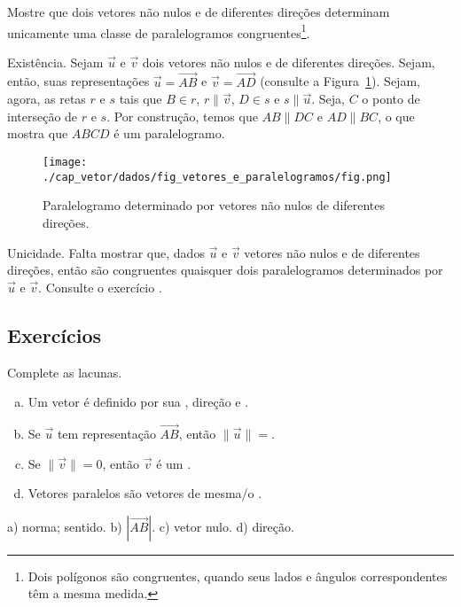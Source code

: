 \begin{exeresol}\label{cap_vetor_sec_vetor:exeresol:vetores_e_paralelogramos}
  Mostre que dois vetores não nulos e de diferentes direções determinam unicamente uma classe de paralelogramos congruentes\footnote{Dois polígonos são congruentes, quando seus lados e ângulos correspondentes têm a mesma medida.}.
\end{exeresol}
\begin{resol}
  Existência. Sejam $\vec{u}$ e $\vec{v}$ dois vetores não nulos e de diferentes direções. Sejam, então, suas representações $\vec{u}=\overrightarrow{AB}$ e $\vec{v}=\overrightarrow{AD}$ (consulte a Figura~\ref{cap_vetor_sec_vetor:fig:vetores_e_paralelogramos}). Sejam, agora, as retas $r$ e $s$ tais que $B\in r$, $r\parallel\vec{v}$, $D\in s$ e $s\parallel\vec{u}$. Seja, $C$ o ponto de interseção de $r$ e $s$. Por construção, temos que $AB\parallel DC$ e $AD\parallel BC$, o que mostra que $ABCD$ é um paralelogramo.

  \begin{figure}[h!]
    \centering
    \texttt{[image: ./cap\_vetor/dados/fig\_vetores\_e\_paralelogramos/fig.png]}
    \caption{Paralelogramo determinado por vetores não nulos de diferentes direções.}
    \label{cap_vetor_sec_vetor:fig:vetores_e_paralelogramos}
  \end{figure}
  
  Unicidade. Falta mostrar que, dados $\vec{u}$ e $\vec{v}$ vetores não nulos e de diferentes direções, então são congruentes quaisquer dois paralelogramos determinados por $\vec{u}$ e $\vec{v}$. Consulte o exercício .
  
\end{resol}

\subsection{Exercícios}

\begin{exer}
  Complete as lacunas.
  \begin{enumerate}[a)]
    \item Um vetor é definido por sua \underline{\phantom{norma}}, direção e \underline{\phantom{sentido}}.
    \item Se $\vec{u}$ tem representação $\overrightarrow{AB}$, então $\|\vec{u}\|=$\underline{}.
    \item Se $\|\vec{v}\|=0$, então $\vec{v}$ é um \underline{\phantom{vetor nulo}}.
    \item Vetores paralelos são vetores de mesma/o \underline{\phantom{direção}}.
  \end{enumerate}
\end{exer}
\begin{resp}
  a) norma; sentido. b) $\left|\overrightarrow{AB}\right|$. c) vetor nulo. d) direção.
\end{resp}

